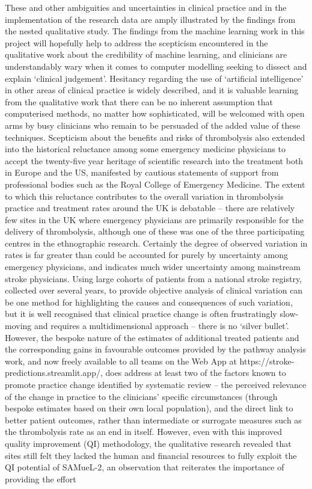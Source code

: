 These and other ambiguities and uncertainties in clinical practice and in the implementation of the research data are amply illustrated by the findings from the nested qualitative study. The findings from the machine learning work in this project will hopefully help to address the scepticism encountered in the qualitative work about the credibility of machine learning, and clinicians are understandably wary when it comes to computer modelling seeking to dissect and explain ‘clinical judgement’. Hesitancy regarding the use of ‘artificial intelligence’ in other areas of clinical practice is widely described, and it is valuable learning from the qualitative work that there can be no inherent assumption that computerised methods, no matter how sophisticated, will be welcomed with open arms by busy clinicians who remain to be persuaded of the added value of these techniques\cite{akinrinmade_artificial_nodate}. Scepticism about the benefits and risks of thrombolysis also extended into the historical reluctance among some emergency medicine physicians to accept the twenty-five year heritage of scientific research into the treatment both in Europe and the US, manifested by cautious statements of support from professional bodies such as the Royal College of Emergency Medicine\cite{royal_college_of_emergency_medicine_acute_2015}. The extent to which this reluctance contributes to the overall variation in thrombolysis practice and treatment rates around the UK is debatable – there are relatively few sites in the UK where emergency physicians are primarily responsible for the delivery of thrombolysis, although one of these was one of the three participating centres in the ethnographic research. Certainly the degree of observed variation in rates is far greater than could be accounted for purely by uncertainty among emergency physicians, and indicates much wider uncertainty among mainstream stroke physicians. Using large cohorts of patients from a national stroke registry, collected over several years, to provide objective analysis of clinical variation can be one method for highlighting the causes and consequences of such variation, but it is well recognised that clinical practice change is often frustratingly slow-moving and requires a multidimensional approach – there is no ‘silver bullet’. However, the bespoke nature of the estimates of additional treated patients and the corresponding gains in favourable outcomes provided by the pathway analysis work, and now freely available to all teams on the Web App at https://stroke-predictions.streamlit.app/, does address at least two of the factors known to promote practice change identified by systematic review \cite{ivers_audit_2012, baker_tailored_nodate} – the perceived relevance of the change in practice to the clinicians’ specific circumstances (through bespoke estimates based on their own local population), and the direct link to better patient outcomes, rather than intermediate or surrogate measures such as the thrombolysis rate as an end in itself. However, even with this improved quality improvement (QI) methodology, the qualitative research revealed that sites still felt they lacked the human and financial resources to fully exploit the QI potential of SAMueL-2, an observation that reiterates the importance of providing the effort 